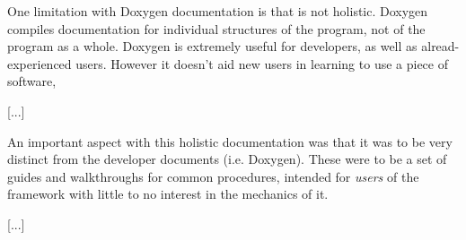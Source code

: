 One limitation with Doxygen documentation is that is not holistic. Doxygen compiles documentation for individual structures of the program, not of the program as a whole. Doxygen is extremely useful for developers, as well as alread-experienced users. However it doesn't aid new users in learning to use   a piece of software, 

[...]

An important aspect with this holistic documentation was that it was to be very distinct from the developer documents (i.e. Doxygen). These were to be a set of guides and walkthroughs for common procedures, intended for \emph{users} of the framework with little to no interest in the mechanics of it.

[...]